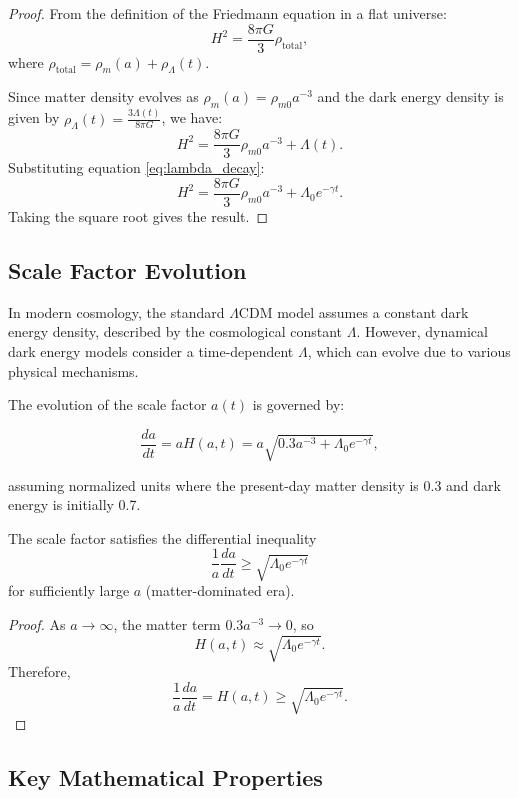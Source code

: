 \begin{proof}
From the definition of the Friedmann equation in a flat universe:
\[
H^2 = \frac{8\pi G}{3} \rho_{\text{total}},
\]
where $\rho_{\text{total}} = \rho_m(a) + \rho_{\Lambda}(t)$. 

Since matter density evolves as $\rho_m(a) = \rho_{m0} a^{-3}$ and the dark energy density is given by $\rho_{\Lambda}(t) = \frac{3\Lambda(t)}{8\pi G}$, we have:
\[
H^2 = \frac{8\pi G}{3}\rho_{m0} a^{-3} + \Lambda(t).
\]
Substituting equation \eqref{eq:lambda_decay}:
\[
H^2 = \frac{8\pi G}{3}\rho_{m0} a^{-3} + \Lambda_0 e^{-\gamma t}.
\]
Taking the square root gives the result.
\end{proof}

\subsection{Scale Factor Evolution}

In modern cosmology, the standard $\Lambda$CDM model assumes a constant dark energy density, described by the cosmological constant $\Lambda$. However, dynamical dark energy models consider a time-dependent $\Lambda$, which can evolve due to various physical mechanisms.

The evolution of the scale factor $a(t)$ is governed by:

\begin{equation}
\frac{da}{dt} = a H(a,t) = a \sqrt{0.3 a^{-3} + \Lambda_0 e^{-\gamma t}},
\label{eq:scale_factor_ode}
\end{equation}

assuming normalized units where the present-day matter density is 0.3 and dark energy is initially 0.7.

\begin{lemma}
The scale factor satisfies the differential inequality
\[
\frac{1}{a}\frac{da}{dt} \geq \sqrt{\Lambda_0 e^{-\gamma t}}
\]
for sufficiently large $a$ (matter-dominated era).
\end{lemma}

\begin{proof}
As $a \to \infty$, the matter term $0.3 a^{-3} \to 0$, so
\[
H(a,t) \approx \sqrt{\Lambda_0 e^{-\gamma t}}.
\]
Therefore,
\[
\frac{1}{a}\frac{da}{dt} = H(a,t) \geq \sqrt{\Lambda_0 e^{-\gamma t}}.
\]
\end{proof}

\subsection{Key Mathematical Properties}

